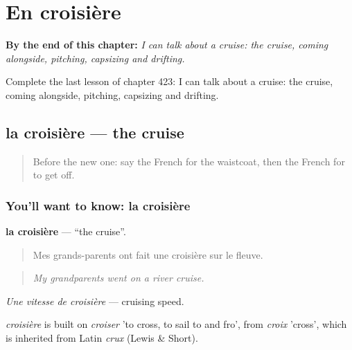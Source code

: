 
\chapter{En croisière}
\label{ch:fr-en-croisiere}

\begin{chapteropening}
\textbf{By the end of this chapter:} \emph{I can talk about a cruise: the cruise, coming alongside, pitching, capsizing and drifting.}

Complete the last lesson of chapter 423: I can talk about a cruise: the cruise, coming alongside, pitching, capsizing and drifting.
\end{chapteropening}

\section[la croisière]{la croisière — the cruise}

\label{lesson:FR-C423-croisiere}



\begin{quote}
Before the new one: say the French for the waistcoat, then the French for to get off.
\end{quote}

\subsection*{You'll want to know: la croisière}
\textbf{la croisière} — \textquotedblleft{}the cruise\textquotedblright{}.

\begin{quote}
Mes grands-parents ont fait une croisière sur le fleuve.
\end{quote}

\begin{quote}
\emph{My grandparents went on a river cruise.}
\end{quote}

\emph{Une vitesse de croisière} — cruising speed.

\begin{cousinweb}
\emph{croisière} is built on \emph{croiser} 'to cross, to sail to and fro', from \emph{croix} 'cross', which is inherited from Latin \emph{crux} (Lewis \& Short).
\end{cousinweb}

